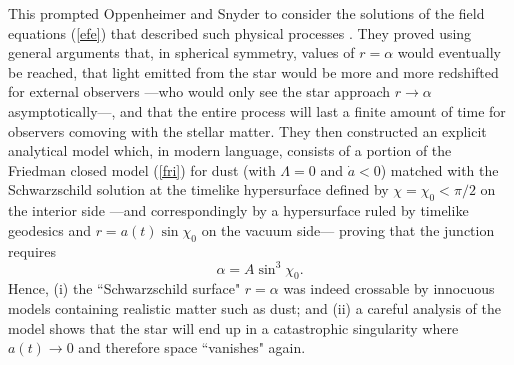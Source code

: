 \documentclass[12pt]{iopart}
\begin{document}
This prompted Oppenheimer and Snyder to consider the solutions of the field equations (\ref{efe}) that described such physical processes \cite{OS}. They proved using general arguments that, in spherical symmetry,  values of $r=\alpha$ would eventually be reached, that light emitted from the star would be more and more redshifted for external observers ---who would only see the star approach $r\rightarrow \alpha$ asymptotically---, and that the entire process will last a finite amount of time for observers comoving with the stellar matter. They then constructed an explicit analytical model which, in modern language, consists of a portion of the Friedman closed model (\ref{fri}) for dust (with $\Lambda =0$ and $\dot a <0$) matched with the Schwarzschild solution at the timelike hypersurface defined by $\chi =\chi_0 <\pi/2$ on the interior side ---and correspondingly by a hypersurface ruled by timelike geodesics and $r=a(t) \sin\chi_0$ on the vacuum side--- proving that the junction requires 
$$
\alpha = A \sin^3\chi_0.
$$ 
Hence, (i) the ``Schwarzschild surface" $r=\alpha$ was indeed crossable by innocuous models 
containing realistic matter such as dust; and (ii) a careful analysis of the  model shows that the star will end up in a catastrophic singularity where $a(t)\rightarrow 0$ and therefore space ``vanishes" again.
\end{document}
